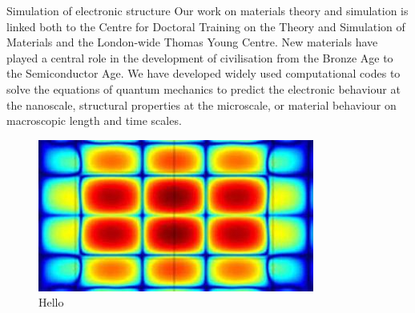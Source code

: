 \documentclass[xcolor={table}]{beamer}
\begin{document}
\begin{frame}[fragile=singleslide,t]
\begin{columns}[onlytextwidth,T]
\begin{column}{.47\textwidth}
\begin{block}{Simulation of electronic structure}
Our work on materials theory and simulation is linked both to the Centre for
Doctoral Training on the Theory and Simulation of Materials and the London-wide
Thomas Young Centre. New materials have played a central role in the development
of civilisation from the Bronze Age to the Semiconductor Age. We have developed
widely used computational codes to solve the equations of quantum mechanics to
predict the electronic behaviour at the nanoscale, structural properties at the
microscale, or material behaviour on macroscopic length and time scales.
\end{block}

\begin{figure}
    \includegraphics[width=\columnwidth, height=0.15\textheight]{simulation_materials.jpg}
    \caption{\footnotesize Hello}
\end{figure}

\end{column}
\end{columns}

\end{frame}
\end{document}
